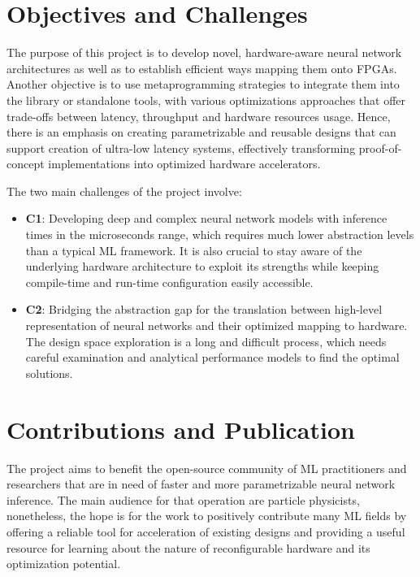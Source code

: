 \section{Objectives and Challenges}
The purpose of this project is to develop novel, hardware-aware neural network architectures as well as to establish efficient ways mapping them onto FPGAs. Another objective is to use metaprogramming strategies to integrate them into the \hlsml library or standalone tools, with various optimizations approaches that offer trade-offs between latency, throughput and hardware resources usage. Hence, there is an emphasis on creating parametrizable and reusable designs that can support creation of ultra-low latency systems, effectively transforming proof-of-concept implementations into optimized hardware accelerators.

The two main challenges of the project involve:

\begin{itemize}
  \item \textbf{C1}: Developing deep and complex neural network models with inference times in the microseconds range, which requires much lower abstraction levels than a typical ML framework. It is also crucial to stay aware of the underlying hardware architecture to exploit its strengths while keeping compile-time and run-time configuration easily accessible.
  \item \textbf{C2}: Bridging the abstraction gap for the translation between high-level representation of neural networks and their optimized mapping to hardware. The design space exploration is a long and difficult process, which needs careful examination and analytical performance models to find the optimal solutions.
\end{itemize}


\section{Contributions and Publication}
The project aims to benefit the open-source community of ML practitioners and researchers that are in need of faster and more parametrizable neural network inference. The main audience for that operation are particle physicists, nonetheless, the hope is for the work to positively contribute many ML fields by offering a reliable tool for acceleration of existing designs and providing a useful resource for learning about the nature of reconfigurable hardware and its optimization potential.

